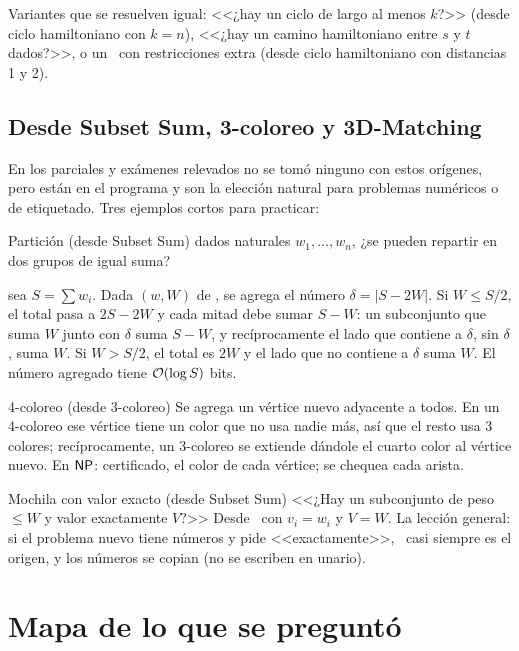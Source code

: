 Variantes que se resuelven igual: <<¿hay un ciclo de largo al menos $k$?>> (desde ciclo hamiltoniano con $k=n$), <<¿hay un camino hamiltoniano entre $s$ y $t$ dados?>>, o un \npTSP\ con restricciones extra (desde ciclo hamiltoniano con distancias 1 y 2).

\subsection{Desde Subset Sum, 3-coloreo y 3D-Matching}

En los parciales y exámenes relevados no se tomó ninguno con estos orígenes, pero están en el programa y son la elección natural para problemas numéricos o de etiquetado. Tres ejemplos cortos para practicar:

\begin{problema}{Partición (desde Subset Sum)}
 dados naturales $w_1,\dots,w_n$, ¿se pueden repartir en dos grupos de igual suma?

 sea $S=\sum w_i$. Dada $(w,W)$ de \npSS, se agrega el número $\delta=|S-2W|$. Si $W\le S/2$, el total pasa a $2S-2W$ y cada mitad debe sumar $S-W$: un subconjunto que suma $W$ junto con $\delta$ suma $S-W$, y recíprocamente el lado que contiene a $\delta$, sin $\delta$, suma $W$. Si $W>S/2$, el total es $2W$ y el lado que no contiene a $\delta$ suma $W$. El número agregado tiene $\mathcal{O}(\log S)$ bits.
\end{problema}

\begin{problema}{4-coloreo (desde 3-coloreo)}
Se agrega un vértice nuevo adyacente a todos. En un 4-coloreo ese vértice tiene un color que no usa nadie más, así que el resto usa 3 colores; recíprocamente, un 3-coloreo se extiende dándole el cuarto color al vértice nuevo. En $\mathsf{NP}$: certificado, el color de cada vértice; se chequea cada arista.
\end{problema}

\begin{problema}{Mochila con valor exacto (desde Subset Sum)}
<<¿Hay un subconjunto de peso $\le W$ y valor exactamente $V$?>> Desde \npSS\ con $v_i=w_i$ y $V=W$. La lección general: si el problema nuevo tiene números y pide <<exactamente>>, \npSS\ casi siempre es el origen, y los números se copian (no se escriben en unario).
\end{problema}

\section{Mapa de lo que se preguntó}

